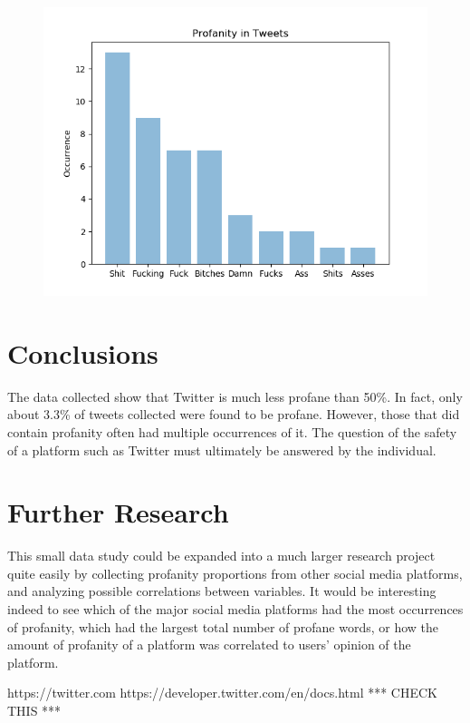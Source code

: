 \documentclass{article}
\begin{document}
\begin{figure}[h]
	\includegraphics[scale=1]{Figure_2}
\end{figure}

\section{Conclusions}
\tab The data collected show that Twitter is much less profane than 50\%. In fact, only about 3.3\% of tweets collected were found to be profane. However, those that did contain profanity often had multiple occurrences of it. The question of the safety of a platform such as Twitter must ultimately be answered by the individual.

\section{Further Research}
\tab This small data study could be expanded into a much larger research project quite easily by collecting profanity proportions from other social media platforms, and analyzing possible correlations between variables. It would be interesting indeed to see which of the major social media platforms had the most occurrences of profanity, which had the largest total number of profane words, or how the amount of profanity of a platform was correlated to users' opinion of the platform. 

\newpage
\begin{thebibliography}{}
	https://twitter.com
	https://developer.twitter.com/en/docs.html *** CHECK THIS ***

	
	
\end{thebibliography}
\end{document}
